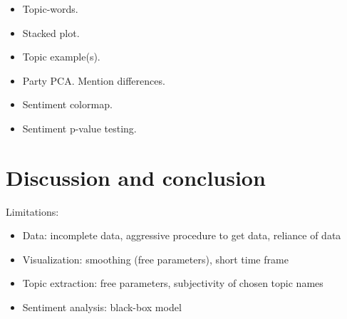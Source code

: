 \documentclass{article}
\begin{document}
\begin{itemize}
  \item Topic-words.
  \item Stacked plot.
  \item Topic example(s).
  \item Party PCA. Mention differences.
  \item Sentiment colormap.
  \item Sentiment p-value testing.
\end{itemize}

\section{Discussion and conclusion}
Limitations:
\begin{itemize}
  \item Data: incomplete data, aggressive procedure to get data, reliance of data
  \item Visualization: smoothing (free parameters), short time frame
  \item Topic extraction: free parameters, subjectivity of chosen topic names
  \item Sentiment analysis: black-box model
\end{itemize}



\end{document}
